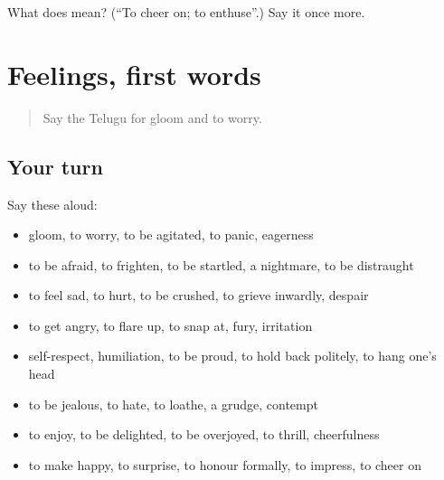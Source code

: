 \begin{tcolorbox}[breakable,colback=teal!4,colframe=teal!35!black,title={Before you move on}]
What does  mean? (\textquotedblleft{}To cheer on; to enthuse\textquotedblright{}.) Say it once more.
\end{tcolorbox}
\section[(dialogue)]{Feelings, first words}

\label{lesson:TE-R501-review-494-501}



\begin{quote}
Say the Telugu for gloom and to worry.
\end{quote}

\subsection*{Your turn}
Say these aloud:

\begin{itemize}
\raggedright
  \item gloom, to worry, to be agitated, to panic, eagerness
  \item to be afraid, to frighten, to be startled, a nightmare, to be distraught
  \item to feel sad, to hurt, to be crushed, to grieve inwardly, despair
  \item to get angry, to flare up, to snap at, fury, irritation
  \item self-respect, humiliation, to be proud, to hold back politely, to hang one's head
  \item to be jealous, to hate, to loathe, a grudge, contempt
  \item to enjoy, to be delighted, to be overjoyed, to thrill, cheerfulness
  \item to make happy, to surprise, to honour formally, to impress, to cheer on
\end{itemize}

